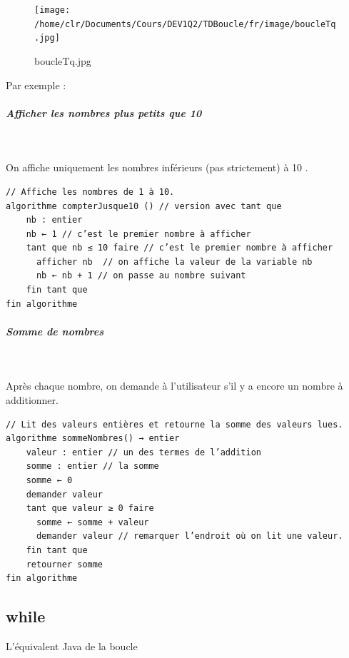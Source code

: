 \documentclass[11pt,a4paper]{article}
\begin{document}
            \par
        \begin{figure}[hbt]
				    \begin{center}
					\texttt{[image: /home/clr/Documents/Cours/DEV1Q2/TDBoucle/fr/image/boucleTq.jpg]}
						\end{center}
                
                    \caption[boucleTq.jpg]{boucleTq.jpg}
                \end{figure}
                    
            \par
        Par exemple : 
            \par
        
			
		\subparagraph{Afficher les nombres plus petits que 10} 
		
					\textcolor{white}{.} \par
				On affiche uniquement les nombres inf\'erieurs (pas strictement) \`a 10 .
            \par
        \begin{verbatim}
// Affiche les nombres de 1 à 10.
algorithme compterJusque10 () // version avec tant que
    nb : entier
    nb ← 1 // c’est le premier nombre à afficher
    tant que nb ≤ 10 faire // c’est le premier nombre à afficher
      afficher nb  // on affiche la valeur de la variable nb
      nb ← nb + 1 // on passe au nombre suivant
    fin tant que
fin algorithme
      \end{verbatim}
			
		\subparagraph{Somme de nombres} 
		
					\textcolor{white}{.} \par
				 Apr\`es chaque nombre, on demande \`a l'utilisateur s'il y a encore un nombre \`a additionner.
            \par
        \begin{verbatim}
// Lit des valeurs entières et retourne la somme des valeurs lues.
algorithme sommeNombres() → entier
    valeur : entier // un des termes de l’addition
    somme : entier // la somme
    somme ← 0
    demander valeur
    tant que valeur ≥ 0 faire
      somme ← somme + valeur
      demander valeur // remarquer l’endroit où on lit une valeur.
    fin tant que
    retourner somme
fin algorithme
      \end{verbatim}\subsection{while}
		    L'\'equivalent Java de la boucle 
		  
\end{document}
